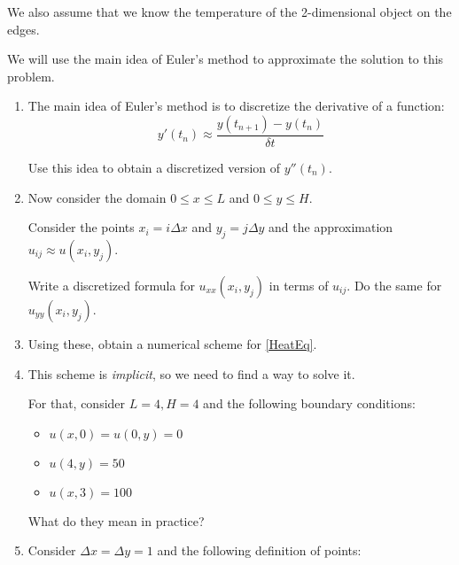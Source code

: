 \documentclass[letter]{article}
\begin{document}
We also assume that we know the temperature of the 2-dimensional object on the edges.

We will use the main idea of Euler's method to approximate the solution to this problem.


\begin{enumerate}[resume, label=\textbf{\arabic*.}]
	\item The main idea of Euler's method is to discretize the derivative of a function:
	\[ y'(t_n) \approx \frac{y(t_{n+1}) - y(t_n)}{\delta t} \]
	
	Use this idea to obtain a discretized version of $y''(t_n)$.
	
	
	\item Now consider the domain $0 \leq x \leq L$ and $0 \leq y \leq H$.
	\begin{center}
	\end{center}

	Consider the points $x_i = i \Delta x$ and $y_j = j \Delta y$ and the approximation $u_{ij} \approx u(x_i ,y_j)$.
	
	Write a discretized formula for $u_{xx}(x_i,y_j)$ in terms of $u_{ij}$. Do the same for $u_{yy}(x_i,y_j)$.
	
	\item Using these, obtain a numerical scheme for \eqref{HeatEq}.

	\item This scheme is \textit{implicit}, so we need to find a way to solve it.
	
	For that, consider $L=4, H=4$ and the following boundary conditions:
	\begin{itemize}
		\item $u(x,0) = u(0,y) = 0$
		\item $u(4,y) = 50$
		\item $u(x,3) = 100$
	\end{itemize}
	
	What do they mean in practice?
	
	\item Consider $\Delta x = \Delta y = 1$ and the following definition of points:
		\begin{center}
\end{center}
\end{enumerate}
\end{document}

